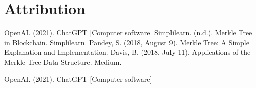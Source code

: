 \documentclass{article}
\begin{document}
\section{Attribution}
OpenAI. (2021). ChatGPT [Computer software]
\newline
Simplilearn. (n.d.). Merkle Tree in Blockchain. Simplilearn. 
\newline
Pandey, S. (2018, August 9). Merkle Tree: A Simple Explanation and Implementation. 
\newline
Davis, B. (2018, July 11). Applications of the Merkle Tree Data Structure. Medium. 
\begin{thebibliography}{9}
  OpenAI. (2021). ChatGPT [Computer software]
  \end{thebibliography}
\end{document}
